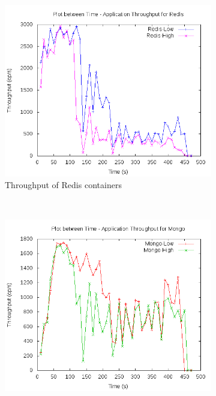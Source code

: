 	\begin{figure}[t!]
	  \centering
	  \begin{subfigure}[t]{0.48\textwidth}
	    \centering
	    \includegraphics[width=1\textwidth]{images/inference/above_sl_redis.png}
	    \caption{Throughput of Redis containers}
	    \label{plot_inference_above_sl_redis}
	  \end{subfigure}
	  ~ 
	  \begin{subfigure}[t]{0.48\textwidth}
	    \centering
	    \includegraphics[width=1\textwidth]{images/inference/above_sl_mongo.png}

\end{subfigure}
\end{figure}
